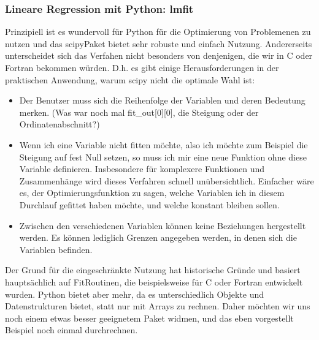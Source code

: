 \documentclass[letterpaper,10pt,english]{jupyterBook}
\begin{document}
\subsubsection{Lineare Regression mit Python: lmfit }
\label{\detokenize{content/1_Kurvenanpassung:lineare-regression-mit-python-lmfit-a-id-subsec-lmfit-linreg-a}}
\sphinxAtStartPar
Prinzipiell ist es wundervoll für Python für die Optimierung von Problemenen zu nutzen und das scipy\sphinxhyphen{}Paket bietet sehr robuste und einfach Nutzung. Andererseits unterscheidet sich das Verfahen nicht besonders von denjenigen, die wir in C oder Fortran bekommen würden. D.h. es gibt einige Herausforderungen in der praktischen Anwendung, warum scipy nicht die optimale Wahl ist:
\begin{itemize}
\item {} 
\sphinxAtStartPar
Der Benutzer muss sich die Reihenfolge der Variablen und deren Bedeutung merken. (Was war noch mal fit\_out{[}0{]}{[}0{]}, die Steigung oder der Ordinatenabschnitt?)

\item {} 
\sphinxAtStartPar
Wenn ich eine Variable nicht fitten möchte, also ich möchte zum Beispiel die Steigung auf fest Null setzen, so muss ich mir eine neue Funktion ohne diese Variable definieren. Insbesondere für komplexere Funktionen und Zusammenhänge wird dieses Verfahren schnell unübersichtlich. Einfacher wäre es, der Optimierungsfunktion zu sagen, welche Variablen ich in diesem Durchlauf gefittet haben möchte, und welche konstant bleiben sollen.

\item {} 
\sphinxAtStartPar
Zwischen den verschiedenen Variablen können keine Beziehungen hergestellt werden. Es können lediglich Grenzen angegeben werden, in denen sich die Variablen befinden.

\end{itemize}

\sphinxAtStartPar
Der Grund für die eingeschränkte Nutzung hat historische Gründe und basiert hauptsächlich auf Fit\sphinxhyphen{}Routinen, die beispielsweise für C oder Fortran entwickelt wurden. Python bietet aber mehr, da es unterschiedlich Objekte und Datenstrukturen bietet, statt nur mit Arrays zu rechnen. Daher möchten wir uns noch einem etwas besser geeignetem Paket widmen, und das eben vorgestellt Beispiel noch einmal durchrechnen.
\end{document}
